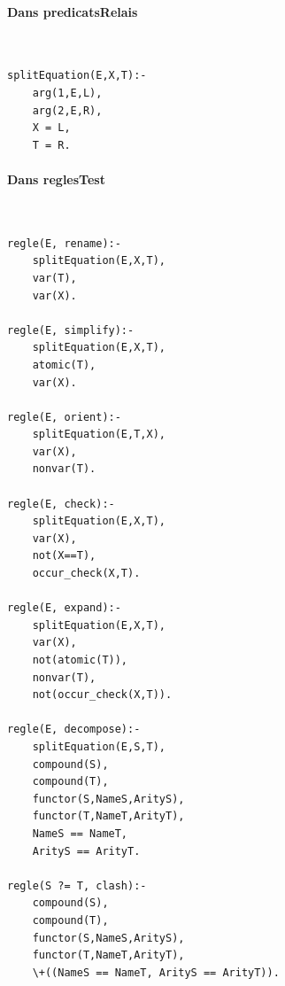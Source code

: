 \documentclass[10pt,a4paper]{report}
\begin{document}
\paragraph{Dans predicatsRelais} ~\\
\begin{lstlisting}[caption ={$predicatsRelais.pl$}]
splitEquation(E,X,T):-
	arg(1,E,L),
	arg(2,E,R),
	X = L,
	T = R.
\end{lstlisting}

\paragraph{Dans reglesTest} ~\\
\begin{lstlisting}[caption ={$reglesTest.pl$}]
regle(E, rename):-
	splitEquation(E,X,T),
	var(T),
	var(X).

regle(E, simplify):-
	splitEquation(E,X,T),
	atomic(T),
	var(X).

regle(E, orient):-
	splitEquation(E,T,X),
	var(X),
	nonvar(T).

regle(E, check):-
	splitEquation(E,X,T),
	var(X),
	not(X==T),
	occur_check(X,T).

regle(E, expand):-
	splitEquation(E,X,T),
	var(X),
	not(atomic(T)),
	nonvar(T),
	not(occur_check(X,T)).

regle(E, decompose):-
	splitEquation(E,S,T),
	compound(S),
	compound(T),
	functor(S,NameS,ArityS),
	functor(T,NameT,ArityT),
	NameS == NameT,
	ArityS == ArityT.

regle(S ?= T, clash):-
	compound(S),
	compound(T),
	functor(S,NameS,ArityS),
	functor(T,NameT,ArityT),
	\+((NameS == NameT, ArityS == ArityT)).
\end{lstlisting}
\end{document}
